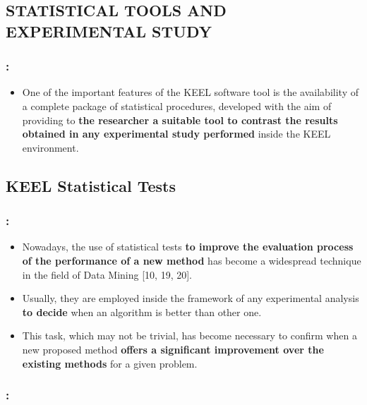\documentclass{beamer}
\begin{document}
\begin{CJK*}{UTF8}{bsmi}
\section{STATISTICAL TOOLS AND EXPERIMENTAL STUDY} 


\begin{frame}
	\frametitle{\insertsection : \insertsubsection}
	
	
	\begin{itemize}
		\item One of the important features of the KEEL software tool is the availability of a complete package of statistical procedures, developed with the aim of providing to\textbf{ the researcher a suitable tool to contrast the results obtained in any experimental study performed }inside the KEEL environment.
	\end{itemize}
	
	
\end{frame}
\subsection{KEEL Statistical Tests}

\begin{frame}
	\frametitle{\insertsection : \insertsubsection}
	
	
	\begin{itemize}
		\item Nowadays, the use of statistical tests \textbf{to improve the evaluation process of the performance of a new method }has become a widespread technique in the field of Data Mining [10, 19, 20]. 
		\item Usually, they are employed inside the framework of any experimental analysis \textbf{to decide} when an algorithm is better than other one.
		\item This task, which may not be trivial, has become necessary to confirm when a new proposed method \textbf{offers a significant improvement over the existing methods} for a given problem.
	\end{itemize}
	
	
\end{frame}

\begin{frame}
	\frametitle{\insertsection : \insertsubsection}
	

\end{frame}
\end{CJK*}
\end{document}
